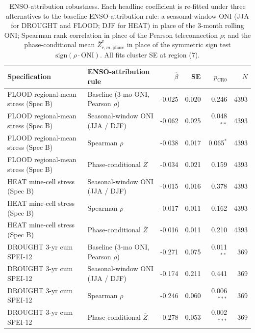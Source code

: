 \begin{table}[H]
\centering
\caption{ENSO-attribution robustness. Each headline coefficient is re-fitted under three alternatives to the baseline ENSO-attribution rule: a seasonal-window ONI (JJA for DROUGHT and FLOOD; DJF for HEAT) in place of the 3-month rolling ONI; Spearman rank correlation in place of the Pearson teleconnection $\rho$; and the phase-conditional mean $\overline{Z}^v_{r,m,\text{phase}}$ in place of the symmetric sign test $\text{sign}(\rho \cdot \text{ONI})$. All fits cluster SE at region (7).}
\label{tab:enso-robust}
\small
\begin{tabular}{llrrrr}
\toprule
\textbf{Specification} & \textbf{ENSO-attribution rule} & $\hat\beta$ & SE & $p_{\text{CR0}}$ & $N$ \\
\midrule
FLOOD regional-mean stress (Spec B) & Baseline (3-mo ONI, Pearson $\rho$) & -0.025 & 0.020 & 0.246 & 4393 \\
FLOOD regional-mean stress (Spec B) & Seasonal-window ONI (JJA / DJF) & -0.062 & 0.025 & 0.048$^{**}$ & 4393 \\
FLOOD regional-mean stress (Spec B) & Spearman $\rho$ & -0.038 & 0.017 & 0.065$^{*}$ & 4393 \\
FLOOD regional-mean stress (Spec B) & Phase-conditional $\overline{Z}$ & -0.034 & 0.021 & 0.159 & 4393 \\
HEAT mine-cell stress (Spec B) & Seasonal-window ONI (JJA / DJF) & -0.015 & 0.016 & 0.378 & 4393 \\
HEAT mine-cell stress (Spec B) & Spearman $\rho$ & -0.017 & 0.011 & 0.162 & 4393 \\
HEAT mine-cell stress (Spec B) & Phase-conditional $\overline{Z}$ & -0.016 & 0.011 & 0.210 & 4393 \\
DROUGHT 3-yr cum SPEI-12 & Baseline (3-mo ONI, Pearson $\rho$) & -0.271 & 0.075 & 0.011$^{**}$ &  369 \\
DROUGHT 3-yr cum SPEI-12 & Seasonal-window ONI (JJA / DJF) & -0.174 & 0.211 & 0.441 &  369 \\
DROUGHT 3-yr cum SPEI-12 & Spearman $\rho$ & -0.246 & 0.060 & 0.006$^{***}$ &  369 \\
DROUGHT 3-yr cum SPEI-12 & Phase-conditional $\overline{Z}$ & -0.278 & 0.053 & 0.002$^{***}$ &  369 \\
\bottomrule
\end{tabular}
\end{table}

